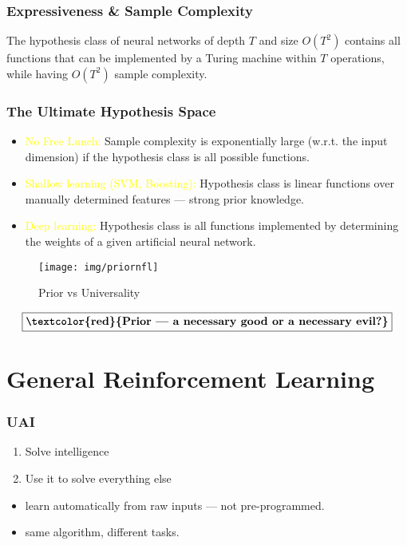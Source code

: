 \documentclass[UTF8,11pt,colorlinks,compress,openany]{beamer}%
\begin{document}
\begin{frame}\frametitle{Expressiveness \& Sample Complexity}
	\begin{theorem}
	The hypothesis class of neural networks of depth $T$ and size $O(T^2)$ contains all functions that can be implemented by a Turing machine within $T$ operations, while having $O(T^2)$ sample complexity.
	\end{theorem}
\end{frame}

\begin{frame}\frametitle{The Ultimate Hypothesis Space}
\begin{itemize}
	\item \textcolor{yellow}{No Free Lunch:} Sample complexity is exponentially large (w.r.t. the input dimension) if the hypothesis class is all possible functions.
	\item \textcolor{yellow}{Shallow learning (SVM, Boosting):} Hypothesis class is linear functions over manually determined features --- strong prior knowledge.
	\item \textcolor{yellow}{Deep learning:} Hypothesis class is all functions implemented by determining the weights of a given artificial neural network.
\end{itemize}\vspace{-1ex}
	\begin{figure}[H]
	\texttt{[image: img/priornfl]}\vspace{-2ex}\caption{Prior vs Universality}
	\end{figure}
	\[\fbox{\textbf{\textcolor{red}{Prior --- a necessary good or a necessary evil?}}}\]
\end{frame}

\section{General Reinforcement Learning}

\begin{frame}\frametitle{UAI}
	\begin{enumerate}
		\item Solve intelligence
		\item Use it to solve everything else
	\end{enumerate}
	\begin{itemize}
		\item learn automatically from raw inputs --- not pre-programmed.
		\item same algorithm, different tasks.
	\end{itemize}
\end{frame}
\end{document}
